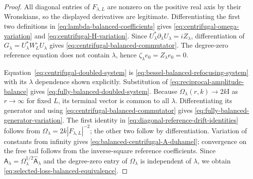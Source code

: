 \documentclass[11pt]{article}
\newcommand{\Id}{\mathrm I}
\theoremstyle{definition}
\theoremstyle{remark}
\begin{document}
\begin{proof}
All diagonal entries of $F_{\lambda,L}$ are nonzero on the positive real
axis by their Wronskians, so the displayed derivatives are legitimate.
Differentiating the first two definitions in
\eqref{eq:lambda-balanced-coefficients} gives
\eqref{eq:centrifugal-omega-variation} and
\eqref{eq:centrifugal-H-variation}.  Since
$U_\lambda^*\partial_\lambda U_\lambda=iZ_\lambda$, differentiation of
$G_\lambda=U_\lambda^*W_L^\circ U_\lambda$ gives
\eqref{eq:centrifugal-balanced-commutator}.  The degree-zero reference equation
does not contain $\lambda$, hence $\zeta_\lambda e_0=Z_\lambda e_0=0$.

Equation~\eqref{eq:centrifugal-doubled-system} is
\eqref{eq:bessel-balanced-refocusing-system} with its $\lambda$ dependence
shown explicitly.  Substitution of
\eqref{eq:reciprocal-amplitude-balance} gives
\eqref{eq:fully-balanced-doubled-system}.  Because
$\Omega_\lambda(r,k)\to2k\Id$ as $r\to\infty$ for fixed $L$, its terminal
vector is common to all $\lambda$.  Differentiating its generator and using
\eqref{eq:centrifugal-balanced-commutator} gives
\eqref{eq:fully-balanced-generator-variation}.  The first identity in
\eqref{eq:diagonal-reference-drift-identities} follows from
$\Omega_\lambda=2k|F_{\lambda,L}|^{-2}$; the other two follow by
differentiation.  Variation of constants from infinity gives
\eqref{eq:balanced-centrifugal-A-duhamel}; convergence on the free tail follows
from the inverse-square reference coefficients.  Since
$\mathsf A_\lambda=\Omega_\lambda^{1/2}
\widehat{\mathsf A}_\lambda$ and the degree-zero entry of $\Omega_\lambda$ is
independent of $\lambda$, we obtain
\eqref{eq:selected-loss-balanced-equivalence}.


\end{proof}
\end{document}
